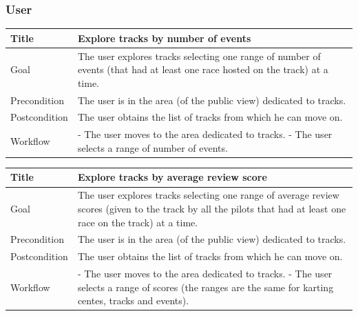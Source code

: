 \documentclass{beamer}
\begin{document}
\begin{frame}
    \frametitle{User}
    \begin{table}
        \tiny
        \begin{tabular}{|p{2cm}|p{6cm}|}
        \hline
        Title & \textbf{Explore tracks by number of events} \\
        \hline
        Goal & The user explores tracks selecting one range of number of events
        (that had at least one race hosted on the track) at a time. \\
        \hline
        Precondition & The user is in the area (of the public view) dedicated to tracks.\\
        \hline
        Postcondition & The user obtains the list of tracks from which he can move on.\\
        \hline
        Workflow &
        - The user moves to the area dedicated to tracks. \newline
        - The user selects a range of number of events. \\
        \hline
        \end{tabular}
\end{table}

\begin{table}
    \tiny
    \begin{tabular}{|p{2cm}|p{6cm}|}
    \hline
    Title & \textbf{Explore tracks by average review score} \\
    \hline
    Goal & The user explores tracks selecting one range of average review scores (given to the track by all the pilots
    that had at least one race on the track) at a time. \\
    \hline
    Precondition & The user is in the area (of the public view) dedicated to tracks.\\
    \hline
    Postcondition & The user obtains the list of tracks from which he can move on.\\
    \hline
    Workflow &
    - The user moves to the area dedicated to tracks. \newline
    - The user selects a range of scores (the ranges are the same for karting centes, tracks and events). \\
    \hline
    \end{tabular}
\end{table}
\end{frame}

\end{document}
